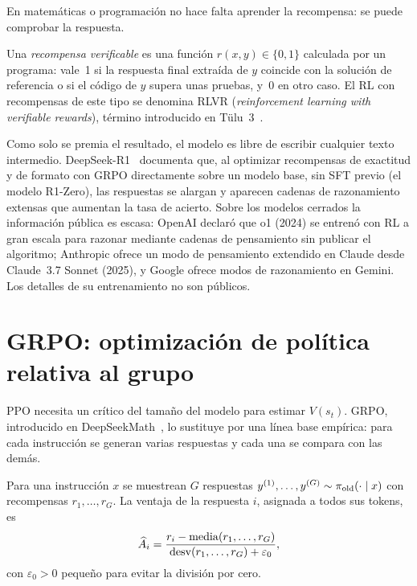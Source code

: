 En matemáticas o programación no hace falta aprender la recompensa: se puede comprobar la respuesta.

\begin{definicion}\label{def:rlvr}
Una \emph{recompensa verificable} es una función $r(x,y)\in\{0,1\}$ calculada por un programa: vale~1 si la respuesta final extraída de $y$ coincide con la solución de referencia o si el código de $y$ supera unas pruebas, y~0 en otro caso. El RL con recompensas de este tipo se denomina RLVR (\emph{reinforcement learning with verifiable rewards}), término introducido en Tülu~3~\cite{tulu3}.
\end{definicion}

Como solo se premia el resultado, el modelo es libre de escribir cualquier texto intermedio. DeepSeek-R1~\cite{r1} documenta que, al optimizar recompensas de exactitud y de formato con GRPO directamente sobre un modelo base, sin SFT previo (el modelo R1-Zero), las respuestas se alargan y aparecen cadenas de razonamiento extensas que aumentan la tasa de acierto. Sobre los modelos cerrados la información pública es escasa: OpenAI declaró que o1 (2024) se entrenó con RL a gran escala para razonar mediante cadenas de pensamiento sin publicar el algoritmo; Anthropic ofrece un modo de pensamiento extendido en Claude desde Claude~3.7 Sonnet (2025), y Google ofrece modos de razonamiento en Gemini. Los detalles de su entrenamiento no son públicos.

\section{GRPO: optimización de política relativa al grupo}

PPO necesita un crítico del tamaño del modelo para estimar $V(s_t)$. GRPO, introducido en DeepSeekMath~\cite[§4.1]{deepseekmath}, lo sustituye por una línea base empírica: para cada instrucción se generan varias respuestas y cada una se compara con las demás.

\begin{definicion}\label{def:grpo-ventaja}
Para una instrucción $x$ se muestrean $G$ respuestas $y^{(1)},\dots,y^{(G)}\sim\pi_{\mathrm{old}}(\cdot\mid x)$ con recompensas $r_1,\dots,r_G$. La ventaja de la respuesta $i$, asignada a todos sus tokens, es
\[
\widehat A_i=\frac{r_i-\operatorname{media}(r_1,\dots,r_G)}{\operatorname{desv}(r_1,\dots,r_G)+\varepsilon_0},
\]
con $\varepsilon_0>0$ pequeño para evitar la división por cero.
\end{definicion}

